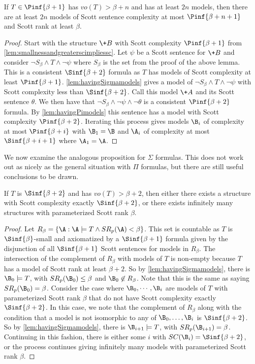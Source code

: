 \documentclass[10pt,a4paper]{amsart}
\renewcommand{\-}{\text{-}}
\begin{document}
\begin{lemma}
If $T\in \Pinf{\beta+1}$ has $vo(T)>\beta+n$ and has at least $2n$ models, then there are at least $2n$ models of Scott sentence complexity at most $\Pinf{\beta+n+1}$ and Scott rank at least $\beta$.
\end{lemma}
\begin{proof}
  Start with the structure $\+B$ with Scott complexity $\Pinf{\beta+1}$ from \cref{lem:smallnessandgreaterscimpliessc}. Let $\psi$ be a Scott sentence for $\+B$ and consider $\neg S_\beta\land T\land \neg \psi$ where $S_\beta$ is the set from the proof of the above lemma. This is a consistent $\Sinf{\beta+2}$ formula as $T$ has models of Scott complexity at least $\Pinf{\beta+1}$. \cref{lem:havingSigmamodels} gives a model of $\neg S_\beta\land T\land \neg \psi$ with Scott complexity less than $\Sinf{\beta+2}$. Call this model $\+A$ and its Scott sentence $\theta$. We then have that $\neg S_\beta\land \neg \psi\land \neg \theta$ is a consistent $\Pinf{\beta+2}$ formula. By \cref{lem:havingPimodels} this sentence has a model with Scott complexity $\Pinf{\beta+2}$. Iterating this process gives models $\B_i$ of complexity at most $\Pinf{\beta+i}$ with $\B_1=\B$ and $\A_i$ of complexity at most $\Sinf{\beta+i+1}$ where $\A_1=\A$. 
  \end{proof}

We now examine the analogous proposition for $\Sigma$ formulas.
This does not work out as nicely as the general situation with $\Pi$ formulas, but there are still useful conclusions to be drawn.
    
\begin{proposition}\label{prop:sigmasmallnessandgreaterscimpliessc}
If $T$ is $\Sinf{\beta+2}$ and has $vo(T)>\beta+2$, then either there exists a structure with Scott complexity exactly $\Sinf{\beta+2}$, or there exists infinitely many structures with parameterized Scott rank $\beta$.
\end{proposition}

\begin{proof}
Let $R_{\beta}=\{\A : \A\models T \land SR_p(\A)<\beta\}$. This set is countable as $T$ is $\Sinf{\beta}$-small and axiomatized by a $\Sinf{\beta+1}$ formula given by the disjunction of all $\Sinf{\beta+1}$ Scott sentences for models in $R_\beta$. The intersection of the complement of $R_\beta$ with models of $T$ is non-empty because $T$ has a model of Scott rank at least $\beta+2$. So by \cref{lem:havingSigmamodels}, there is $\B_0\models T$, with $SR_p(\B_0)\leq\beta$ and $\B_0\not\in R_\beta$. Note that this is the same as saying $SR_p(\B_0)=\beta$.  Consider the case where $\B_0,\cdots,\B_i$ are models of $T$ with parameterized Scott rank $\beta$ that do not have Scott complexity exactly $\Sinf{\beta+2}$. In this case, we note that the complement of $R_\beta$ along with the condition that a model is not isomorphic to any of $\B_0,\dots,\B_i$ is $\Sinf{\beta+2}$. So by \cref{lem:havingSigmamodels}, there is $\B_{i+1}\models T$, with $SR_p(\B_{i+1})=\beta$. Continuing in this fashion, there is either some $i$ with $SC(\B_{i})=\Sinf{\beta+2}$, or the process continues giving infinitely many models with parameterized Scott rank $\beta$.
\end{proof}
\end{document}
